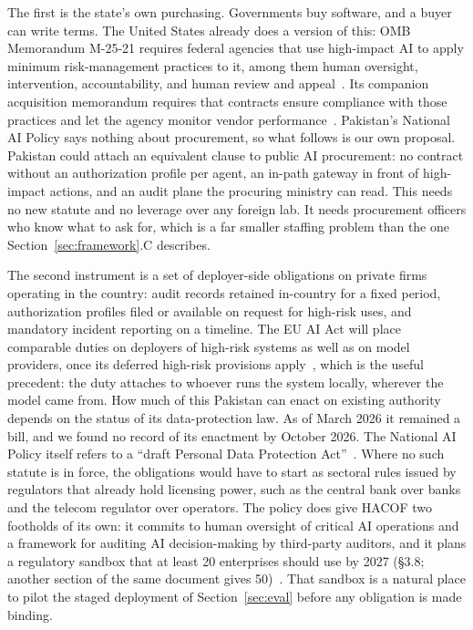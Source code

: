 \documentclass{ieeeaccess}
\newcommand{\hacof}{HACOF}
\begin{document}
The first is the state's own purchasing. Governments buy software, and a buyer can write terms. The United States already does a version of this: OMB Memorandum M-25-21 requires federal agencies that use high-impact AI to apply minimum risk-management practices to it, among them human oversight, intervention, accountability, and human review and appeal~\cite{omb2025m2521}.
Its companion acquisition memorandum requires that contracts ensure compliance with those practices and let the agency monitor vendor performance~\cite{omb2025m2522}.
Pakistan's National AI Policy says nothing about procurement, so what follows is our own proposal. Pakistan could attach an equivalent clause to public AI procurement: no contract without an authorization profile per agent, an in-path gateway in front of high-impact actions, and an audit plane the procuring ministry can read. This needs no new statute and no leverage over any foreign lab. It needs procurement officers who know what to ask for, which is a far smaller staffing problem than the one Section~\ref{sec:framework}.C describes.

The second instrument is a set of deployer-side obligations on private firms operating in the country: audit records retained in-country for a fixed period, authorization profiles filed or available on request for high-risk uses, and mandatory incident reporting on a timeline. The EU AI Act will place comparable duties on deployers of high-risk systems as well as on model providers, once its deferred high-risk provisions apply~\cite{euaiact2024,euaiomnibus2026},
which is the useful precedent: the duty attaches to whoever runs the system locally, wherever the model came from. How much of this Pakistan can enact on existing authority depends on the status of its data-protection law. As of March 2026 it remained a bill, and we found no record of its enactment by October 2026. The National AI Policy itself refers to a ``draft Personal Data Protection Act''~\cite{pakistan2025nationalaipolicy,chambers2026pakistandp}.
Where no such statute is in force, the obligations would have to start as sectoral rules issued by regulators that already hold licensing power, such as the central bank over banks and the telecom regulator over operators.
The policy does give \hacof{} two footholds of its own: it commits to human oversight of critical AI operations and a framework for auditing AI decision-making by third-party auditors, and it plans a regulatory sandbox that at least 20 enterprises should use by 2027 (\S3.8; another section of the same document gives 50)~\cite{pakistan2025nationalaipolicy}. That sandbox is a natural place to pilot the staged deployment of Section~\ref{sec:eval} before any obligation is made binding.
\end{document}
